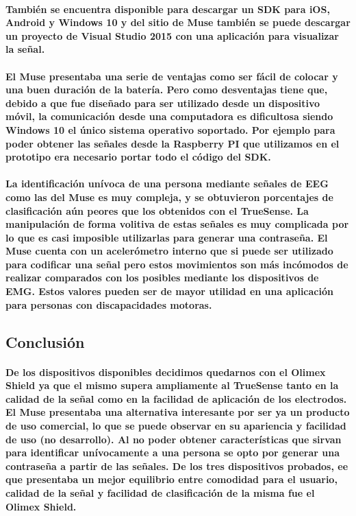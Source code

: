 \documentclass{article}
\begin{document}
\paragraph{
También se encuentra disponible para descargar un SDK para iOS, Android y Windows 10 y del sitio de Muse también se puede descargar un proyecto de Visual Studio 2015 con una aplicación para visualizar la señal.
}

\paragraph{
El Muse presentaba una serie de ventajas como ser fácil de colocar y una buen duración de la batería. Pero como desventajas tiene que, debido a que fue diseñado para ser utilizado desde un dispositivo móvil, la comunicación desde una computadora es dificultosa siendo Windows 10 el único sistema operativo soportado. Por ejemplo para poder obtener las señales desde la Raspberry PI que utilizamos en el prototipo era necesario portar todo el código del SDK.
}

\paragraph{
La identificación unívoca de una persona mediante señales de EEG como las del Muse es muy compleja, y se obtuvieron porcentajes de clasificación aún peores que los obtenidos con el TrueSense. La manipulación de forma volitiva de estas señales es muy complicada por lo que es casi imposible utilizarlas para generar una contraseña. El Muse cuenta con un acelerómetro interno que si puede ser utilizado para codificar una señal pero estos movimientos son más incómodos de realizar comparados con los posibles mediante los dispositivos de EMG. Estos valores pueden ser de mayor utilidad en una aplicación para personas con discapacidades motoras.
}

\subsection{Conclusión}
\paragraph{
De los dispositivos disponibles decidimos quedarnos con el Olimex Shield ya que el mismo supera ampliamente al TrueSense tanto en la calidad de la señal como en la facilidad de aplicación de los electrodos. El Muse presentaba una alternativa interesante por ser ya un producto de uso comercial, lo que se puede observar en su apariencia y facilidad de uso (no desarrollo). Al no poder obtener características que sirvan para identificar unívocamente a una persona se opto por generar una contraseña a partir de las señales. De los tres dispositivos probados, ee que presentaba un mejor equilibrio entre comodidad para el usuario, calidad de la señal y facilidad de clasificación de la misma fue el Olimex Shield.
}
\end{document}
